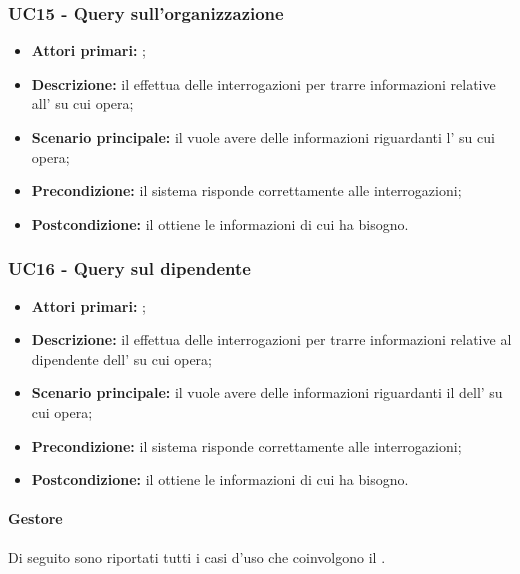 \documentclass[../analisi-dei-requisiti]{subfiles}
\begin{document}
\subsubsection{UC15 - Query sull'organizzazione}
\label{subsub:UC15}

\begin{itemize}
  \item \textbf{Attori primari:} ;
  \item \textbf{Descrizione:} il  effettua delle interrogazioni per trarre informazioni relative all' su cui opera;
  \item \textbf{Scenario principale:} il  vuole avere delle informazioni riguardanti l' su cui opera;
  \item \textbf{Precondizione:} il sistema risponde correttamente alle interrogazioni;
  \item \textbf{Postcondizione:} il  ottiene le informazioni di cui ha bisogno.

\end{itemize}


\subsubsection{UC16 - Query sul dipendente}
\label{subsub:UC16}

\begin{itemize}
  \item \textbf{Attori primari:} ;
  \item \textbf{Descrizione:} il  effettua delle interrogazioni per trarre informazioni relative al dipendente dell' su cui opera;
  \item \textbf{Scenario principale:} il  vuole avere delle informazioni riguardanti il dell' su cui opera;
  \item \textbf{Precondizione:} il sistema risponde correttamente alle interrogazioni;
  \item \textbf{Postcondizione:} il  ottiene le informazioni di cui ha bisogno.

\end{itemize}

\paragraph{Gestore}
Di seguito sono riportati tutti i casi d'uso che coinvolgono il  .
\end{document}
